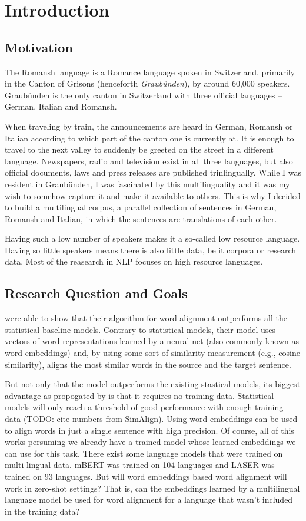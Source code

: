 \chapter{Introduction}
\section{Motivation}
The Romansh language is a Romance language spoken in Switzerland, primarily in the Canton of Grisons (henceforth \emph{Graubünden}), by around 60,000 speakers. 
Graubünden is the only canton in Switzerland with three official languages -- German, Italian and Romansh.

When traveling by train, the announcements are heard in German, Romansh or Italian according to which part of the canton one is currently at. 
It is enough to travel to the next valley to suddenly be greeted on the street in a different language.
Newspapers, radio and television exist in all three languages, but also official documents, laws and press releases are published trinlingually.
While I was resident in Graubünden, I was fascinated by this multilinguality and it was my wish to somehow capture it and make it available to others. 
This is why I decided to build a multilingual corpus, a parallel collection of  sentences in German, Romansh and Italian, in which the sentences are translations of each other.

Having such a low number of speakers makes it a so-called low resource language. 
Having so little speakers means there is also little data, be it corpora or research data.
Most of the reasearch in NLP focuses on high resource languages. 


\section{Research Question and Goals}
\cite{jalili-sabet-etal-2020-simalign} were able to show that their algorithm for word alignment outperforms all the statistical baseline models. 
Contrary to statistical models, their model uses vectors of word representations learned by a neural net (also commonly known as word embeddings) and, by using some sort of similarity measurement (e.g., cosine similarity), aligns the most similar words in the source and the target sentence. 

But not only that the model outperforms the existing stastical models, its biggest advantage as propogated by \cite{jalili-sabet-etal-2020-simalign} is that it requires no training data. 
Statistical models will only reach a threshold of good performance with enough training data (TODO: cite numbers from SimAlign). 
Using word embeddings can be used to align words in just a single sentence with high precision. 
Of course, all of this works persuming we already have a trained model whose learned embeddings we can use for this task. 
There exist some language models that were trained on multi-lingual data. 
mBERT was trained on 104 languages and LASER was trained on 93 languages. 
But will word embeddings based word alignment will work in zero-shot settings? 
That is, can the embeddings learned by a multilingual language model be used for word alignment for a language that wasn't included in the training data?

